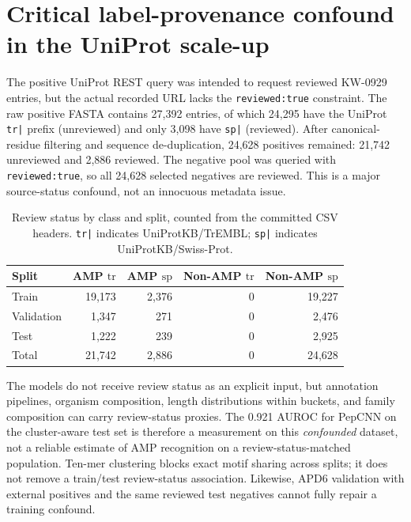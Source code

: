 \section{Critical label-provenance confound in the UniProt scale-up}
\label{sec:labelconfound}
The positive UniProt REST query was intended to request reviewed KW-0929
entries, but the actual recorded URL lacks the \texttt{reviewed:true}
constraint. The raw positive FASTA contains 27{,}392 entries, of which
24{,}295 have the UniProt \texttt{tr|} prefix (unreviewed) and only 3{,}098
have \texttt{sp|} (reviewed). After canonical-residue filtering and
sequence de-duplication, 24{,}628 positives remained: 21{,}742 unreviewed
and 2{,}886 reviewed. The negative pool was queried with
\texttt{reviewed:true}, so all 24{,}628 selected negatives are reviewed.
This is a major source-status confound, not an innocuous metadata issue.

\begin{table}[h]\centering
\caption{Review status by class and split, counted from the committed CSV
headers. \texttt{tr|} indicates UniProtKB/TrEMBL; \texttt{sp|} indicates
UniProtKB/Swiss-Prot.}
\label{tab:reviewconfound}
\begin{tabular}{lrrrr}
\hline
Split & AMP $\mathrm{tr}$ & AMP $\mathrm{sp}$ & Non-AMP $\mathrm{tr}$ & Non-AMP $\mathrm{sp}$ \\
\hline
Train & 19{,}173 & 2{,}376 & 0 & 19{,}227 \\
Validation & 1{,}347 & 271 & 0 & 2{,}476 \\
Test & 1{,}222 & 239 & 0 & 2{,}925 \\
\hline
Total & 21{,}742 & 2{,}886 & 0 & 24{,}628 \\
\hline
\end{tabular}
\end{table}

The models do not receive review status as an explicit input, but annotation
pipelines, organism composition, length distributions within buckets, and
family composition can carry review-status proxies. The 0.921 AUROC for
PepCNN on the cluster-aware test set is therefore a measurement on this
\emph{confounded} dataset, not a reliable estimate of AMP recognition on a
review-status-matched population. Ten-mer clustering blocks exact motif
sharing across splits; it does not remove a train/test review-status
association. Likewise, APD6 validation with external positives and the
same reviewed test negatives cannot fully repair a training confound.

